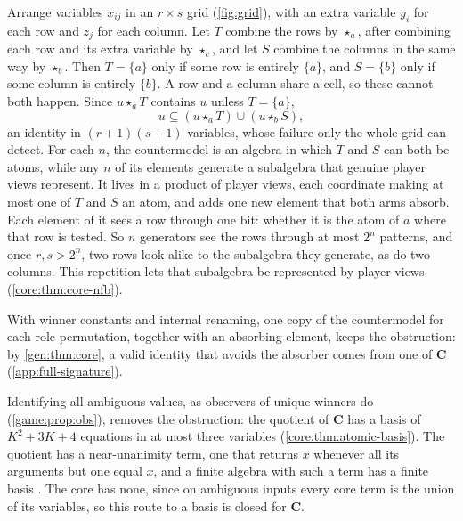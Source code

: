 \begin{idea}
Arrange variables $x_{ij}$ in an $r\times s$ grid (\cref{fig:grid}), with an extra variable $y_i$ for each row and $z_j$ for each column. Let $T$ combine the rows by $\star_a$, after combining each row and its extra variable by $\star_c$, and let $S$ combine the columns in the same way by $\star_b$. Then $T=\{a\}$ only if some row is entirely $\{a\}$, and $S=\{b\}$ only if some column is entirely $\{b\}$. A row and a column share a cell, so these cannot both happen. Since $u\star_a T$ contains $u$ unless $T=\{a\}$,
\[
 u\subseteq(u\star_a T)\cup(u\star_b S),
\]
an identity in $(r+1)(s+1)$ variables, whose failure only the whole grid can detect. For each $n$, the countermodel is an algebra in which $T$ and $S$ can both be atoms, while any $n$ of its elements generate a subalgebra that genuine player views represent. It lives in a product of player views, each coordinate making at most one of $T$ and $S$ an atom, and adds one new element that both arms absorb. Each element of it sees a row through one bit: whether it is the atom of $a$ where that row is tested. So $n$ generators see the rows through at most $2^n$ patterns, and once $r,s>2^n$, two rows look alike to the subalgebra they generate, as do two columns. This repetition lets that subalgebra be represented by player views (\cref{core:thm:core-nfb}).

With winner constants and internal renaming, one copy of the countermodel for each role permutation, together with an absorbing element, keeps the obstruction: by \cref{gen:thm:core}, a valid identity that avoids the absorber comes from one of $\mathbf C$ (\cref{app:full-signature}).
\end{idea}

Identifying all ambiguous values, as observers of unique winners do (\cref{game:prop:obs}), removes the obstruction: the quotient of $\mathbf C$ has a basis of $K^2+3K+4$ equations in at most three variables (\cref{core:thm:atomic-basis}). The quotient has a near-unanimity term, one that returns $x$ whenever all its arguments but one equal $x$, and a finite algebra with such a term has a finite basis \cite{Baker1977}. The core has none, since on ambiguous inputs every core term is the union of its variables, so this route to a basis is closed for $\mathbf C$.
